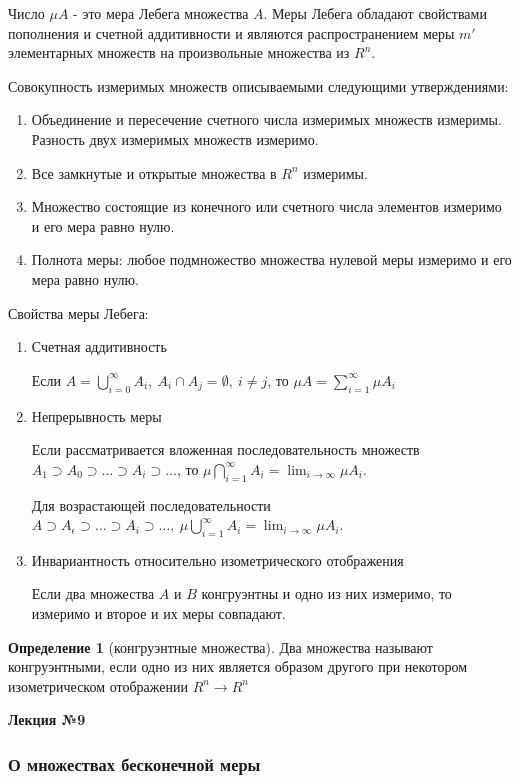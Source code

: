 \documentclass[14pt,a4paper]{extarticle}
\theoremstyle{definition}
\newtheorem{definition}{Определение}[section]
\theoremstyle{remark}
\renewcommand{\[}{\begin{dmath*}[compact]}
\renewcommand{\]}{\end{dmath*}}
\newcommand{\be}{\begin{enumerate}}
\newcommand{\ee}{\end{enumerate}}
\newcommand{\sep}{ , \ \allowbreak }
\begin{document}
Число $\mu A$ - это мера Лебега множества $A$.
Меры Лебега обладают свойствами пополнения и счетной аддитивности и являются
распространением меры $m'$ элементарных множеств на
произвольные множества из $R^n$.

Совокупность измеримых множеств описываемыми следующими утверждениями:
\be
  \item Объединение и пересечение счетного числа измеримых множеств измеримы.
  Разность двух измеримых множеств измеримо.
  \item Все замкнутые и открытые множества в $R^n$ измеримы.
  \item Множество состоящие из конечного или счетного числа элементов
  измеримо и его мера равно нулю.
  \item Полнота меры: любое подмножество множества нулевой меры измеримо
  и его мера равно нулю.
\ee

Свойства меры Лебега:
\be
  \item Счетная аддитивность

  Если $A=\bigcup _{i=0}^\infty A_i\sep A_i\cap A_j=\emptyset\sep i\neq j$,
  то $\mu A=\sum_{i=1}^\infty \mu A_i$

  \item Непрерывность меры

  Если рассматривается вложенная последовательность множеств
  $A_1 \supset A_0 \supset \dots \supset A_i \supset \dots$,
  то $\mu\bigcap _{i=1}^\infty A_i=\lim_{i \to \infty} \mu A_i $.

  Для возрастающей последовательности
  $A \supset A _ \epsilon \supset \dots \supset A_i \supset \dots \sep
  \mu \bigcup _ {i = 1}  ^ \infty A_i = \lim_{i \to \infty} \mu A_i$.

  \item Инвариантность относительно изометрического отображения

  Если два множества $A$ и $B$ конгруэнтны и одно из них измеримо,
  то измеримо и второе и их меры совпадают.
\ee

\begin{definition}[конгруэнтные множества]
  Два множества называют конгруэнтными, если одно из них является
  образом другого при некотором изометрическом отображении $R^n \to R^n$
\end{definition}

\textbf{Лекция №9}

\subsubsection{О множествах бесконечной меры}
\end{document}
